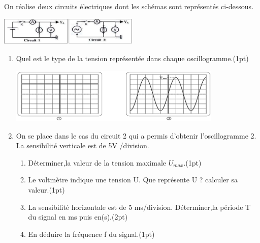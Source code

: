 \documentclass[12pt]{article}
\begin{document}

On réalise deux circuits électriques dont les schémas sont représentés ci-dessous.
\begin{center}
    \includegraphics[width=0.5\textwidth]{./img/circuit_Ex_00.png}
\end{center}

\vspace{3cm}

\begin{enumerate}
    \item Quel est le type de la tension représentée dans  chaque oscillogramme.\dotfill(1pt)
\begin{center}
    \includegraphics[width=0.8\textwidth]{./img/oscillo.png}
\end{center}
\item On se place dans le cas du circuit 2 qui a permis d’obtenir l’oscillogramme 2. La sensibilité verticale est de 5V /division.

    \begin{enumerate}
        \item Déterminer,la valeur de la tension maximale $U_{max}$.\dotfill(1pt)
        \item Le voltmètre indique une tension U. Que représente U ? calculer sa valeur.\dotfill(1pt)
        \item La sensibilité horizontale est de 5 ms/division.
            Déterminer,la période T du signal en ms puis en(s).\dotfill(2pt)
        \item En déduire la fréquence f du signal.\dotfill(1pt)
    \end{enumerate}
\end{enumerate}


\hrulefill\\
\end{document}
